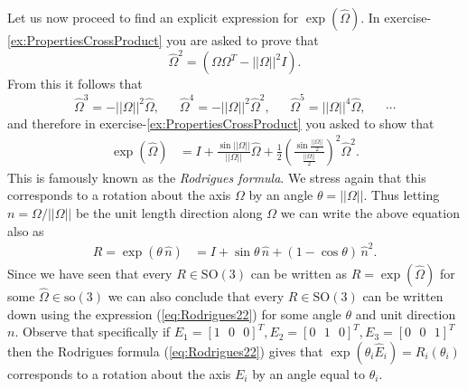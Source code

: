 \documentclass[graybox,envcountchap,sectrefs]{svmonoMuga}
\begin{document}
Let us now proceed to find an explicit expression for $\exp{(\widehat{\Omega})}$. In exercise-\ref{ex:PropertiesCrossProduct} you are asked to prove that 
\[
\widehat{\Omega}^2=(\Omega\Omega^T-||\Omega||^2I).
\]
From this it follows that
\[
\widehat{\Omega}^3=-||\Omega||^2\widehat{\Omega},\:\:\:\:\:\:\:\widehat{\Omega}^4=-||\Omega||^2\widehat{\Omega}^2,\:\:\:\:\:\:\:\widehat{\Omega}^5=||\Omega||^4\widehat{\Omega},\:\:\:\:\:\:\:\cdots
\]
and therefore in exercise-\ref{ex:PropertiesCrossProduct} you asked  to show that
\begin{align}
\exp{\left({\widehat{\Omega}}\right)}&=I+\frac{\sin{||\Omega||}}{||\Omega||}\widehat{\Omega}+\frac{1}{2}\left(\frac{\sin{\frac{||\Omega||}{2}}}{{\frac{||\Omega||}{2}}}\right)^2\widehat{\Omega}^2.\label{eq:Rodrigues0}
\end{align}
This is famously known as the \textit{Rodrigues formula}. We stress again that this corresponds to a rotation about the axis $\Omega$ by an angle $\theta=||\Omega||$. Thus letting $n=\Omega/||\Omega||$ be the unit length direction along $\Omega$ we can write the above equation also as
\begin{align}
R=\exp{\left(\theta\,{\widehat{n}}\right)}&=I+\sin{\theta}\,\widehat{n}+(1-\cos{\theta})\,\widehat{n}^2.\label{eq:Rodrigues22}
\end{align}
Since we have seen that every $R \in \mathrm{SO}(3)$ can be written as $R=\exp{(\widehat{\Omega})}$ for some $\widehat{\Omega}\in \mathrm{so}(3)$ we can also conclude that every $R \in \mathrm{SO}(3)$ can be written down using the expression (\ref{eq:Rodrigues22}) for some angle $\theta$ and unit direction $n$.
Observe that specifically if $E_1=[1\:\:\:0\:\:\:0]^T,E_2=[0\:\:\:1\:\:\:0]^T,E_3=[0\:\:\:0\:\:\:1]^T$ then the Rodrigues formula (\ref{eq:Rodrigues22}) gives that 
$\exp{(\theta_i\widehat{E}_i)}=R_i(\theta_i)$ corresponds to a rotation about the axis $E_i$ by an angle equal to $\theta_i$.
\end{document}
